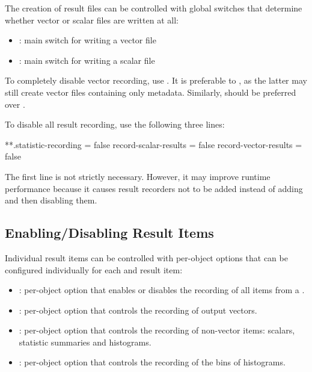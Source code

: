 The creation of result files can be controlled with global switches that determine
whether vector or scalar files are written at all:

\begin{itemize}
  \item {}: main switch for writing a vector file
  \item {}: main switch for writing a scalar file
\end{itemize}

To completely disable vector recording, use .
It is preferable to , as the latter may still
create vector files containing only metadata. Similarly,
 should be preferred over
.

To disable all result recording, use the following three lines:

\begin{inifile}
**.statistic-recording = false
record-scalar-results = false
record-vector-results = false
\end{inifile}

The first line is not strictly necessary. However, it may improve runtime
performance because it causes result recorders not to be added instead of adding
and then disabling them.


\subsection{Enabling/Disabling Result Items}
\label{sec:ana-sim:disabling-result-items}

Individual result items can be controlled with per-object options that can be
configured individually for each  and result item:

\begin{itemize}
  \item {}: per-object option that enables or
    disables the recording of all items from a .
  \item {}: per-object option that controls the
    recording of output vectors.
  \item {}: per-object option that controls the
    recording of non-vector items: scalars, statistic summaries and histograms.
  \item {}: per-object option that controls the recording
    of the bins of histograms.
\end{itemize}

